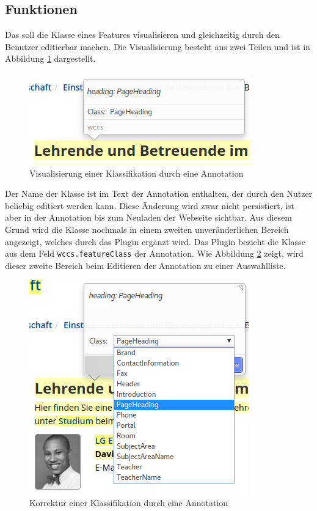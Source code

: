 \subsection{Funktionen}
    Das {\annotatorPlugin} soll die Klasse eines Features visualisieren und gleichzeitig
    durch den Benutzer editierbar machen.
    Die Visualisierung besteht aus zwei Teilen und ist in Abbildung
    \ref{image:annotatorPluginViewer} dargestellt.

    \begin{figure}[htb]
        \centering
        \includegraphics[scale=0.7]{../resources/annotator-plugin/viewer.png}
        \caption{Visualisierung einer Klassifikation durch eine Annotation}
        \label{image:annotatorPluginViewer}
    \end{figure}

    Der Name der Klasse ist im Text der Annotation
    enthalten,
    der durch den Nutzer beliebig editiert werden kann.
    Diese Änderung wird zwar nicht
    persistiert,
    ist aber in der Annotation bis zum Neuladen der Webseite sichtbar.
    Aus diesem Grund wird die Klasse nochmals in einem zweiten unveränderlichen Bereich angezeigt,
    welches durch das Plugin ergänzt wird.
    Das Plugin bezieht die Klasse aus dem Feld \texttt{wccs.featureClass}
    der Annotation.
    Wie Abbildung \ref{image:annotatorPluginEditor} zeigt,
    wird dieser zweite Bereich beim Editieren der Annotation zu einer Auswahlliste.

    \begin{figure}[htb]
        \centering
        \includegraphics[scale=0.7]{../resources/annotator-plugin/editor.png}
        \caption{Korrektur einer Klassifikation durch eine Annotation}
        \label{image:annotatorPluginEditor}
    \end{figure}

